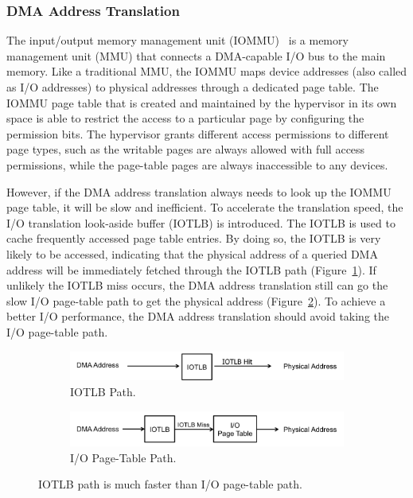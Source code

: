 \subsubsection{DMA Address Translation}
The input/output memory management unit (IOMMU)~\cite{intelvt} is a memory management unit (MMU) that connects a DMA-capable I/O bus to the main memory.
Like a traditional MMU, the IOMMU maps device addresses (also called as I/O addresses) to physical addresses through a dedicated page table.
The IOMMU page table that is created and maintained by the hypervisor in its own space is able to restrict the access to a particular page by configuring the permission bits.
The hypervisor grants different access permissions to different page types, such as the writable pages are always allowed with full access permissions, while the page-table pages are always inaccessible to any devices.

However, if the DMA address translation always needs to look up the IOMMU page table, it will be slow and inefficient.
To accelerate the translation speed, the I/O translation look-aside buffer (IOTLB) is introduced.
The IOTLB is used to cache frequently accessed page table entries.
By doing so, the IOTLB is very likely to be accessed, indicating that the physical address of a queried DMA address will be immediately fetched through the IOTLB path (Figure~\ref{fig:iotlbpath}).
If unlikely the IOTLB miss occurs, the DMA address translation still can go the slow I/O page-table path to get the physical address (Figure~\ref{fig:ioptpath}).
To achieve a better I/O performance, the DMA address translation should avoid taking the I/O page-table path.

\begin{figure}[!t]
    \begin{subfigure}{0.45\textwidth}
        \includegraphics[width=1\textwidth]{image/background/DMA-IOTLB-translation.png}
        \caption{\centering IOTLB Path.}
        \label{fig:iotlbpath}
    \end{subfigure}
    \vfill
    \begin{subfigure}{0.45\textwidth}
        \includegraphics[width=1\textwidth]{image/background/DMA-pt-translation.png}
        \caption{\centering I/O Page-Table Path.}
        \label{fig:ioptpath}
    \end{subfigure}
    \caption{IOTLB path is much faster than I/O page-table path.}
    \label{fig:dma-add-trans}
\end{figure}



